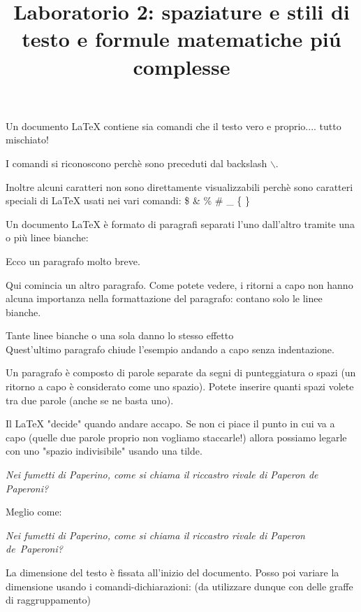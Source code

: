 \documentclass[12pt]{article}
\title{Laboratorio 2:
 spaziature e stili di testo e  formule matematiche pi\'u complesse}
\begin{document}
\maketitle

Un documento \LaTeX {} contiene sia comandi che il testo vero e proprio.... tutto mischiato! 

I comandi si riconoscono perch\`e sono preceduti dal backslash $\backslash$.

Inoltre alcuni caratteri non sono direttamente visualizzabili perch\`e sono caratteri speciali di \LaTeX {} usati nei vari comandi: 
\$ \& \% \# \_ \{ \}

\bigskip %

Un documento \LaTeX {} \`e formato di paragrafi separati l'uno dall'altro tramite una o
pi\`u linee bianche:

Ecco un paragrafo molto breve.

Qui comincia un altro paragrafo. Come potete vedere,
i ritorni a capo
 non hanno
alcuna importanza 
nella
formattazione 
del paragrafo: contano solo le linee bianche. 




Tante linee bianche o una sola danno lo stesso effetto
\\ %
Quest'ultimo paragrafo chiude l'esempio andando a capo senza indentazione. 
 


Un paragrafo \`e composto di parole separate da segni di punteggiatura o spazi (un
ritorno a capo \`e considerato come uno spazio). Potete                   inserire                       quanti 
spazi                    volete                                tra
due                          parole (anche se ne basta uno). 

\bigskip
Il \LaTeX{} "decide" quando andare accapo. Se non ci piace il punto in cui va a capo (quelle due parole proprio non vogliamo staccarle!) allora possiamo legarle con uno "spazio indivisibile" usando una tilde.

{\it Nei fumetti di Paperino, come si chiama  il riccastro rivale  di Paperon de Paperoni?}

Meglio come: 

{\it Nei fumetti di Paperino, come si chiama  il riccastro rivale  di Paperon de~Paperoni?}

\newpage
La dimensione del testo \`e fissata all'inizio del documento. Posso poi variare la dimensione usando i comandi-dichiarazioni:
(da utilizzare dunque con delle graffe di raggruppamento)
\end{document}
